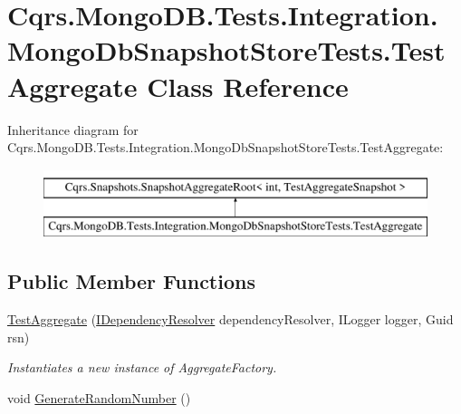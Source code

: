 \hypertarget{classCqrs_1_1MongoDB_1_1Tests_1_1Integration_1_1MongoDbSnapshotStoreTests_1_1TestAggregate}{}\section{Cqrs.\+Mongo\+D\+B.\+Tests.\+Integration.\+Mongo\+Db\+Snapshot\+Store\+Tests.\+Test\+Aggregate Class Reference}
\label{classCqrs_1_1MongoDB_1_1Tests_1_1Integration_1_1MongoDbSnapshotStoreTests_1_1TestAggregate}


 


Inheritance diagram for Cqrs.\+Mongo\+D\+B.\+Tests.\+Integration.\+Mongo\+Db\+Snapshot\+Store\+Tests.\+Test\+Aggregate\+:\begin{figure}[H]
\begin{center}
\leavevmode
\includegraphics[height=2.000000cm]{classCqrs_1_1MongoDB_1_1Tests_1_1Integration_1_1MongoDbSnapshotStoreTests_1_1TestAggregate}
\end{center}
\end{figure}
\subsection*{Public Member Functions}
\begin{DoxyCompactItemize}
\item 
\hyperlink{classCqrs_1_1MongoDB_1_1Tests_1_1Integration_1_1MongoDbSnapshotStoreTests_1_1TestAggregate_a7cba23b8bfc80942c64ac97116d078ed_a7cba23b8bfc80942c64ac97116d078ed}{Test\+Aggregate} (\hyperlink{interfaceCqrs_1_1Configuration_1_1IDependencyResolver}{I\+Dependency\+Resolver} dependency\+Resolver, I\+Logger logger, Guid rsn)
\begin{DoxyCompactList}\small\item\em Instantiates a new instance of Aggregate\+Factory. \end{DoxyCompactList}\item 
void \hyperlink{classCqrs_1_1MongoDB_1_1Tests_1_1Integration_1_1MongoDbSnapshotStoreTests_1_1TestAggregate_abf4cc55c292b34c8a507d80f14d544d3_abf4cc55c292b34c8a507d80f14d544d3}{Generate\+Random\+Number} ()
\end{DoxyCompactItemize}
